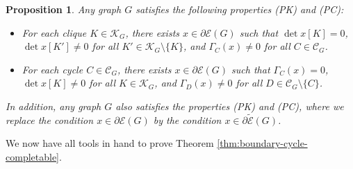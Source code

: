 \documentclass[a4paper, 11pt, twoside]{article}
\newcommand{\ME}{{\mathcal E}}
\newcommand{\MK}{{\mathcal K}}
\newcommand{\MC}{{\mathcal C}}
\newcommand{\tME}{\widetilde \ME}
\theoremstyle{plain}
\newtheorem{proposition}[theorem]{Proposition}
\begin{document}
 \begin{proposition}\label{prop:tool-boundary}
Any graph  $G$    
 satisfies the following properties (PK) and (PC):
\begin{itemize}
\item[(PK)] For each clique $K\in \MK_G$, there exists  $x\in \partial\ME(G)$ such that 
$\det x[K]=0$, 
$\det x[K']\ne 0$ for all $K'\in \MK_G\setminus \{K\}$, and $\Gamma_C(x)\ne 0$ for all $C\in\MC_G$. 
\item[(PC)]  For each cycle $C\in\MC_G$, there exists $x\in\partial \ME(G)$ such that $\Gamma_C(x)=0$,  
$\det x[K]\ne 0$ for all $K\in \MK_G$, and $\Gamma_D(x)\ne 0$ for all $D\in \MC_G\setminus \{C\}$.
\end{itemize}
In addition, any graph $G$ also satisfies the properties (PK) and (PC), where we replace the   condition $x\in \partial \ME(G)$ by the condition $x\in\partial \tME(G)$.
\end{proposition}

We now have all tools in hand to prove Theorem \ref{thm:boundary-cycle-completable}. 
 
\end{document}
